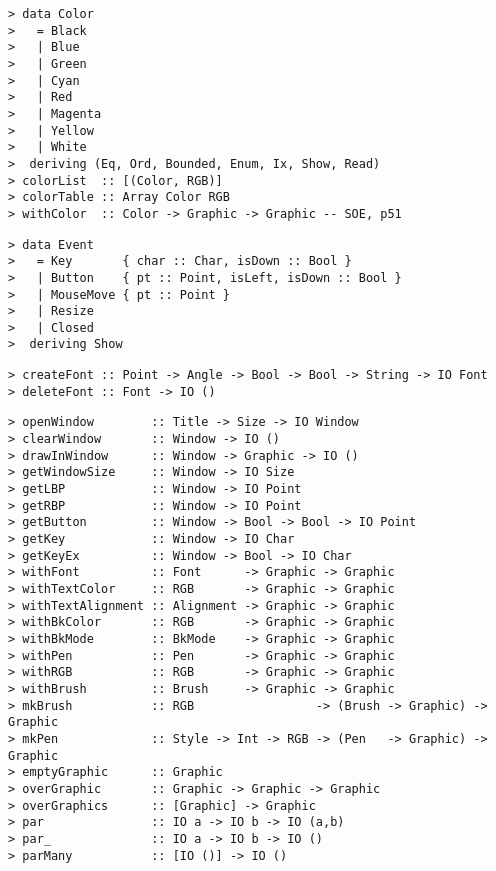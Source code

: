 
\begin{verbatim}
> data Color 
>   = Black
>   | Blue
>   | Green 
>   | Cyan
>   | Red 
>   | Magenta
>   | Yellow
>   | White
>  deriving (Eq, Ord, Bounded, Enum, Ix, Show, Read)
> colorList  :: [(Color, RGB)]
> colorTable :: Array Color RGB
> withColor  :: Color -> Graphic -> Graphic -- SOE, p51
\end{verbatim}


\begin{verbatim}
> data Event 
>   = Key       { char :: Char, isDown :: Bool }
>   | Button    { pt :: Point, isLeft, isDown :: Bool }
>   | MouseMove { pt :: Point }
>   | Resize
>   | Closed
>  deriving Show 
\end{verbatim}


\begin{verbatim}
> createFont :: Point -> Angle -> Bool -> Bool -> String -> IO Font
> deleteFont :: Font -> IO ()
\end{verbatim}


\begin{verbatim}
> openWindow        :: Title -> Size -> IO Window
> clearWindow       :: Window -> IO ()
> drawInWindow      :: Window -> Graphic -> IO ()
> getWindowSize     :: Window -> IO Size
> getLBP            :: Window -> IO Point
> getRBP            :: Window -> IO Point
> getButton         :: Window -> Bool -> Bool -> IO Point
> getKey            :: Window -> IO Char
> getKeyEx          :: Window -> Bool -> IO Char
> withFont          :: Font      -> Graphic -> Graphic
> withTextColor     :: RGB       -> Graphic -> Graphic
> withTextAlignment :: Alignment -> Graphic -> Graphic
> withBkColor       :: RGB       -> Graphic -> Graphic
> withBkMode        :: BkMode    -> Graphic -> Graphic
> withPen           :: Pen       -> Graphic -> Graphic
> withRGB           :: RGB       -> Graphic -> Graphic
> withBrush         :: Brush     -> Graphic -> Graphic
> mkBrush           :: RGB                 -> (Brush -> Graphic) -> Graphic
> mkPen             :: Style -> Int -> RGB -> (Pen   -> Graphic) -> Graphic
> emptyGraphic      :: Graphic
> overGraphic       :: Graphic -> Graphic -> Graphic
> overGraphics      :: [Graphic] -> Graphic
> par               :: IO a -> IO b -> IO (a,b)
> par_              :: IO a -> IO b -> IO ()
> parMany           :: [IO ()] -> IO ()
\end{verbatim}


